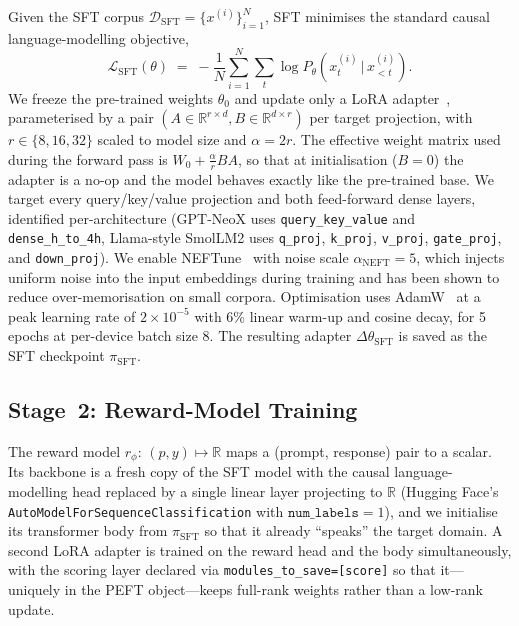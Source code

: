 \documentclass[10pt,twocolumn,letterpaper]{article}
\begin{document}
Given the SFT corpus $\mathcal{D}_\text{SFT} = \{x^{(i)}\}_{i=1}^{N}$, SFT minimises the standard causal language-modelling objective,
\begin{equation}
  \mathcal{L}_\text{SFT}(\theta) \;=\; -\frac{1}{N}\sum_{i=1}^{N}\sum_{t} \log P_{\theta}\!\left(x^{(i)}_{t}\,\big|\,x^{(i)}_{<t}\right).
  \label{eq:sft}
\end{equation}
We freeze the pre-trained weights $\theta_0$ and update only a LoRA adapter~\cite{hu2021lora}, parameterised by a pair $(A\in\mathbb{R}^{r\times d}, B\in\mathbb{R}^{d\times r})$ per target projection, with $r\in\{8,16,32\}$ scaled to model size and $\alpha=2r$. The effective weight matrix used during the forward pass is $W_0 + \tfrac{\alpha}{r} BA$, so that at initialisation ($B=0$) the adapter is a no-op and the model behaves exactly like the pre-trained base. We target every query/key/value projection and both feed-forward dense layers, identified per-architecture (GPT-NeoX uses \texttt{query\_key\_value} and \texttt{dense\_h\_to\_4h}, Llama-style SmolLM2 uses \texttt{q\_proj}, \texttt{k\_proj}, \texttt{v\_proj}, \texttt{gate\_proj}, and \texttt{down\_proj}). We enable NEFTune~\cite{jiang2023neftune} with noise scale $\alpha_{\text{NEFT}}=5$, which injects uniform noise into the input embeddings during training and has been shown to reduce over-memorisation on small corpora. Optimisation uses AdamW~\cite{loshchilov2019decoupled} at a peak learning rate of $2\times10^{-5}$ with 6\% linear warm-up and cosine decay, for 5 epochs at per-device batch size 8. The resulting adapter $\Delta\theta_\text{SFT}$ is saved as the SFT checkpoint $\pi_{\text{SFT}}$.

\subsection{Stage~2: Reward-Model Training}
\label{sec:rm}

The reward model $r_\phi:\,(p,y)\mapsto\mathbb{R}$ maps a (prompt, response) pair to a scalar. Its backbone is a fresh copy of the SFT model with the causal language-modelling head replaced by a single linear layer projecting to $\mathbb{R}$ (Hugging Face's \texttt{AutoModelForSequenceClassification} with $\texttt{num\_labels}=1$), and we initialise its transformer body from $\pi_{\text{SFT}}$ so that it already ``speaks'' the target domain. A second LoRA adapter is trained on the reward head and the body simultaneously, with the scoring layer declared via \texttt{modules\_to\_save=[score]} so that it---uniquely in the PEFT object---keeps full-rank weights rather than a low-rank update.
\end{document}
